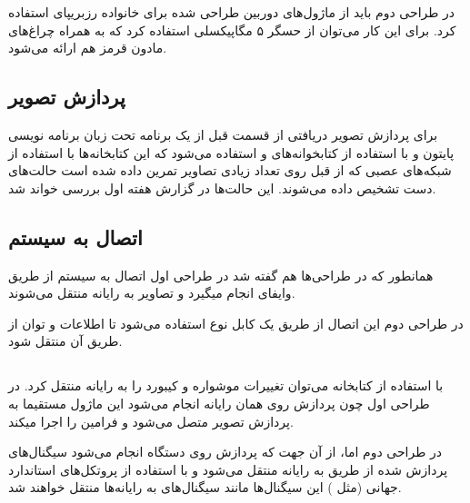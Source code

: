 \documentclass{article}
\begin{document}
در طراحی دوم باید از ماژول‌های دوربین طراحی شده برای خانواده رزبریپای استفاده کرد. برای این کار می‌توان از حسگر ۵ مگاپیکسلی  استفاده کرد که به همراه چراغ‌های مادون قرمز هم ارائه می‌شود.

\subsection{پردازش تصویر}
برای پردازش تصویر دریافتی از قسمت قبل از یک برنامه تحت زبان برنامه نویسی پایتون و با استفاده از کتابخوانه‌های
 و
استفاده می‌شود که این کتابخانه‌ها با استفاده از شبکه‌های عصبی که از قبل روی تعداد زیادی تصاویر تمرین داده شده است حالت‌های دست تشخیص داده می‌شوند. این حالت‌ها در گزارش هفته اول بررسی خواند شد.

\subsection{اتصال به سیستم}
همانطور که در طراحی‌ها هم گفته شد در طراحی اول اتصال به سیستم 
از طریق وایفای انجام میگیرد و تصاویر به رایانه منتقل می‌شوند.

در طراحی دوم این اتصال از طریق یک کابل نوع  استفاده می‌شود تا اطلاعات و توان از طریق آن منتقل شود.

\subsection{}
با استفاده از کتابخانه  می‌توان تغییرات موشواره و کیبورد را به رایانه منتقل کرد. در طراحی اول چون پردازش روی همان رایانه انجام می‌شود این ماژول مستقیما به پردازش تصویر متصل می‌شود و فرامین را اجرا میکند.

در طراحی دوم اما، از آن جهت که پردازش روی دستگاه انجام می‌شود سیگنال‌های پردازش شده از طریق  به رایانه منتقل می‌شود و با استفاده از پروتکل‌های استاندارد جهانی (مثل ) این سیگنال‌ها مانند سیگنال‌های  به رایانه‌ها منتقل خواهند شد.

 
\end{document}
